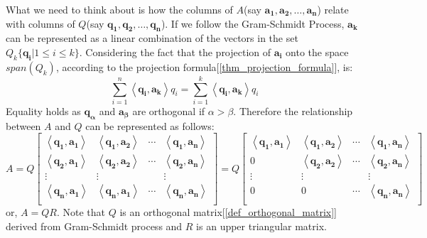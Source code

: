 \documentclass{report}
\begin{document}
			What we need to think about is how the columns of $A$(say $\bm{a_1}, \bm{a_2}, \dots, \bm{a_n}$) relate with columns of $Q$(say $\bm{q_1}, \bm{q_2}, \dots, \bm{q_n}$). If we follow the Gram-Schmidt Process, $\bm{a_k}$ can be represented as a linear combination of the vectors in the set $Q_k\{\bm{q_i}|1 \le i \le k\}$. Considering the fact that the projection of $\bm{a_i}$ onto the space $span(Q_k)$, according to the projection formula[\ref{thm_projection_formula}], is:
			\begin{displaymath}
				\sum_{i=1}^{n}\left<\bm{q_i},\bm{a_k}\right>q_i=\sum_{i=1}^{k}\left<\bm{q_i},\bm{a_k}\right>q_i
			\end{displaymath}
			Equality holds as $\bm{q_\alpha}$ and $\bm{a_\beta}$ are orthogonal if $\alpha>\beta$. Therefore the relationship between $A$ and $Q$ can be represented as follows:
			\begin{displaymath}
				A
				=
				Q
				\begin{bmatrix}
					\left<\bm{q_1}, \bm{a_1}\right> & \left<\bm{q_1}, \bm{a_2}\right> & \cdots & \left<\bm{q_1}, \bm{a_n}\right> \\
					\left<\bm{q_2}, \bm{a_1}\right> & \left<\bm{q_2}, \bm{a_2}\right> & \cdots & \left<\bm{q_2}, \bm{a_n}\right> \\
					\vdots                          & \vdots                          &        & \vdots                          \\
					\left<\bm{q_n}, \bm{a_1}\right> & \left<\bm{q_n}, \bm{a_1}\right> & \cdots & \left<\bm{q_n}, \bm{a_n}\right> \\
				\end{bmatrix}
				=
				Q
				\begin{bmatrix}
				\left<\bm{q_1}, \bm{a_1}\right> & \left<\bm{q_1}, \bm{a_2}\right> & \cdots & \left<\bm{q_1}, \bm{a_n}\right> \\
				0                               & \left<\bm{q_2}, \bm{a_2}\right> & \cdots & \left<\bm{q_2}, \bm{a_n}\right> \\
				\vdots                          & \vdots                          &        & \vdots                          \\
				0                               & 0                               & \cdots & \left<\bm{q_n}, \bm{a_n}\right> \\
				\end{bmatrix}
			\end{displaymath}
			or, $A=QR$. Note that $Q$ is an orthogonal matrix[\ref{def_orthogonal_matrix}] derived from Gram-Schmidt process and $R$ is an upper triangular matrix.
		
\end{document}
